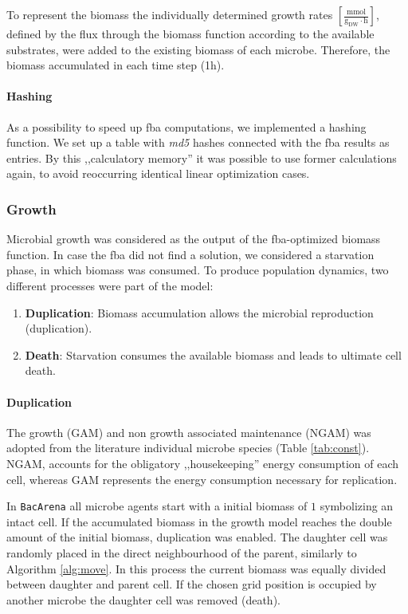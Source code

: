 To represent the biomass the individually determined growth rates $[\frac{\mathrm{mmol}}{\mathrm{g_{DW} \cdot \mathrm{h}}}]$, defined by the flux through the biomass function according to the available substrates, were added to the existing biomass of each microbe. Therefore, the biomass accumulated in each time step (1\;h).

\paragraph{Hashing}
As a possibility to speed up fba computations, we implemented a hashing function.
We set up a table with \textit{md5} hashes connected with the fba results as entries.
By this ,,calculatory memory'' it was possible to use former calculations again, to avoid reoccurring identical linear optimization cases.

\subsubsection{Growth}
Microbial growth was considered as the output of the fba-optimized biomass function. In case the fba did not find a solution, we considered a starvation phase, in which biomass was consumed. 
To produce population dynamics, two different processes were part of the model:
\begin{enumerate}
	\item \textbf{Duplication}: Biomass accumulation allows the microbial reproduction (duplication).
	\item \textbf{Death}: Starvation consumes the available biomass and leads to ultimate cell death.
\end{enumerate}
\paragraph{Duplication}
The growth (GAM) and non growth associated maintenance (NGAM) was adopted from the literature individual microbe species (Table \hyperref[tab:const]{\ref{tab:const}}). NGAM, accounts for the obligatory ,,housekeeping'' energy consumption of each cell, whereas GAM represents the energy consumption necessary for replication. 

In \texttt{BacArena} all microbe agents start with a initial biomass of $1$ symbolizing an intact cell. If the accumulated biomass in the growth model reaches the double amount of the initial biomass, duplication was enabled. The daughter cell was randomly placed in the direct neighbourhood of the parent, similarly to Algorithm \hyperref[alg:move]{\ref{alg:move}}. In this process the current biomass was equally divided between daughter and parent cell. If the chosen grid position is occupied by another microbe the daughter cell was removed (death).
